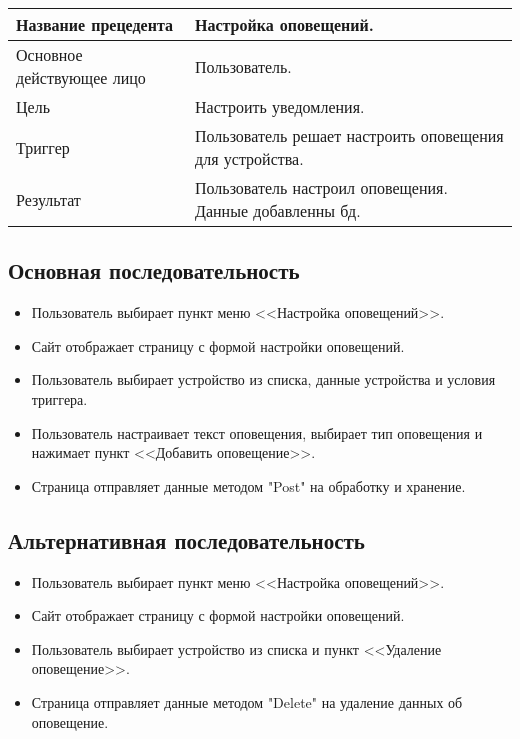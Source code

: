 \begin{center}
    \begin{tabularx}{\textwidth}{|X|X|} \hline
    Название прецедента       & Настройка оповещений.\\ \hline
    Основное действующее лицо & Пользователь.\\ \hline
    Цель                      & Настроить уведомления.\\ \hline
    Триггер                   & Пользователь решает настроить оповещения для устройства.\\ \hline
    Результат                 & Пользователь настроил оповещения. Данные добавленны бд.\\ \hline
    \end{tabularx}
\end{center}

\subsection{Основная последовательность}
\begin{itemize}
    \item Пользователь выбирает пункт меню <<Настройка оповещений>>.
    \item Сайт отображает страницу с формой настройки оповещений.
    \item Пользователь выбирает устройство из списка, данные устройства и условия триггера.
    \item Пользователь настраивает текст оповещения, выбирает тип оповещения и нажимает пункт <<Добавить оповещение>>. 
    \item Страница отправляет данные методом "Post" на обработку и хранение. 
\end{itemize}
\subsection{Альтернативная последовательность}
\begin{itemize}
    \item Пользователь выбирает пункт меню <<Настройка оповещений>>.
    \item Сайт отображает страницу с формой настройки оповещений.
    \item Пользователь выбирает устройство из списка и пункт <<Удаление оповещение>>.
    \item Страница отправляет данные методом "Delete" на удаление данных об оповещение. 
\end{itemize}

